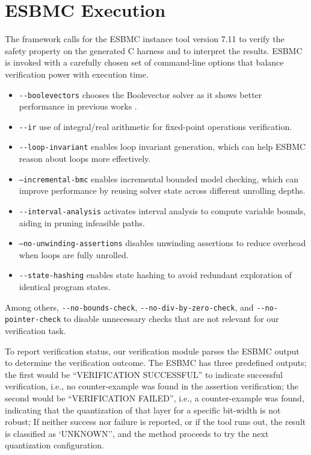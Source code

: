 \section{ESBMC Execution}
The framework calls for the ESBMC instance tool version 7.11 to verify the safety property on the generated C harness and to interpret the results. ESBMC is invoked with a carefully chosen set of command-line options that balance verification power with execution time. 

\begin{itemize}
    \item \texttt{-{}-boolevectors} chooses the Boolevector solver as it shows better performance in previous works \cite{li2025esbmcv76enhancedmodel}.
    \item \texttt{-{}-ir} use of integral/real arithmetic for fixed-point operations verification.
    \item \texttt{-{}-loop-invariant} enables loop invariant generation, which can help ESBMC reason about loops more effectively.
    \item \texttt{--incremental-bmc} enables incremental bounded model checking, which can improve performance by reusing solver state across different unrolling depths.
    \item \texttt{-{}-interval-analysis} activates interval analysis to compute variable bounds, aiding in pruning infeasible paths.
    \item \texttt{--no-unwinding-assertions} disables unwinding assertions to reduce overhead when loops are fully unrolled.
    \item \texttt{-{}-state-hashing} enables state hashing to avoid redundant exploration of identical program states.
\end{itemize}

Among others, \texttt{-{}-no-bounds-check}, \texttt{-{}-no-div-by-zero-check}, and \texttt{-{}-no-pointer-check} to disable unnecessary checks that are not relevant for our verification task.

To report verification status, our verification module parses the ESBMC output to determine the verification outcome. The ESBMC has three predefined outputs; the first would be ``VERIFICATION SUCCESSFUL'' to indicate successful verification, i.e., no counter-example was found in the assertion verification; the second would be ``VERIFICATION FAILED'', i.e., a counter-example was found, indicating that the quantization of that layer for a specific bit-width is not robust; If neither success nor failure is reported, or if the tool runs out, the result is classified as `UNKNOWN'', and the method proceeds to try the next quantization configuration.

